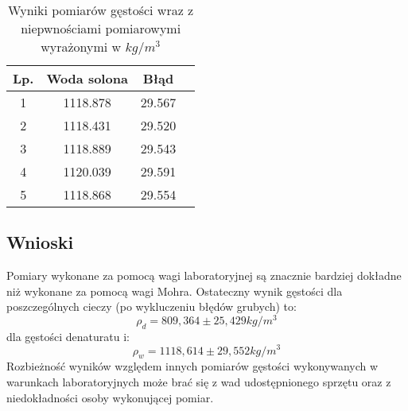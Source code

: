 \documentclass{article} %
\begin{document}
\begin{table}[h!]
\centering
\begin{tabular}{|c|c|c|c|}
\hline
\textbf{Lp.} & \textbf{Woda solona} & \textbf{Błąd} \\
\hline
1 & 1118.878 & 29.567 \\
2 & 1118.431 & 29.520 \\
3 & 1118.889 & 29.543 \\
4 & 1120.039 & 29.591 \\
5 & 1118.868 & 29.554 \\
\hline
\end{tabular}

\caption{Wyniki pomiarów gęstości wraz z niepwnościami pomiarowymi wyrażonymi w $kg/m^3$}
\label{table:students}
\end{table}
\subsection{Wnioski}

Pomiary wykonane za pomocą wagi laboratoryjnej są znacznie bardziej dokładne niż wykonane za pomocą wagi Mohra. Ostateczny wynik gęstości dla poszczególnych cieczy (po wykluczeniu błędów grubych) to:
{\large
\begin{equation}
    \rho_d = 809,364 \pm 25,429kg/m^3
\end{equation}
}
dla gęstości denaturatu i:
{\large
\begin{equation}
    \rho_w = 1118,614 \pm 29,552kg/m^3
\end{equation}
}
Rozbieżność wyników względem innych pomiarów gęstości wykonywanych w warunkach laboratoryjnych może brać się z wad udostępnionego sprzętu oraz z niedokładności osoby wykonującej pomiar.
\end{document}
